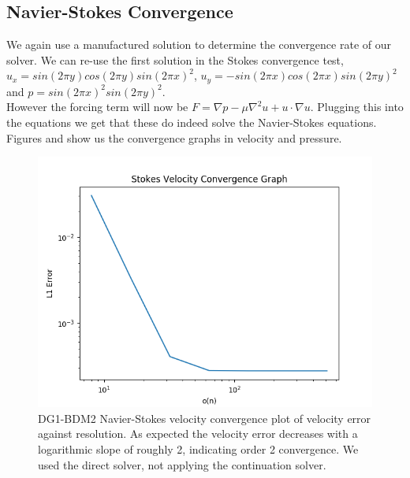 \documentclass[11pt,twoside,a4paper]{article}
\begin{document}
\subsection{Navier-Stokes Convergence}

We again use a manufactured solution to determine the convergence rate of our solver.
We can re-use the first solution in the Stokes convergence test, $u_x = sin(2 \pi y) cos(2 \pi y)sin(2 \pi x)^2$, $u_y= -sin(2 \pi x) cos(2 \pi x) sin(2 \pi y)^2$ and $p = sin(2 \pi x)^2 sin(2 \pi y)^2$.\\
However the forcing term will now be $F = \nabla p - \mu \nabla^2 u + u \cdot \nabla u$.
Plugging this into the equations we get that these do indeed solve the Navier-Stokes equations.\\
Figures and show us the convergence graphs in velocity and pressure.\\

\begin{figure}
  \includegraphics[width=\linewidth]{navier_stokes_convergence_dbc0.png}
  \caption{DG1-BDM2 Navier-Stokes velocity convergence plot of velocity error against resolution. As expected the velocity error decreases with a logarithmic slope of roughly 2, indicating order 2 convergence. We used the direct solver, not applying the continuation solver.}
\end{figure}
\end{document}
